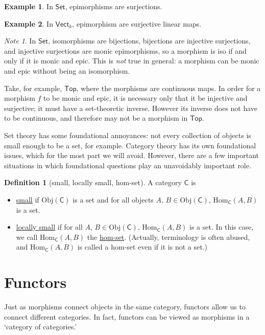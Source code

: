 \documentclass[a4paper]{report}
\newcommand{\defn}[1]{\ul{#1}}
\newcommand{\Obj}{\mathrm{Obj}}
\newcommand{\Hom}{\mathrm{Hom}}
\theoremstyle{definition}
\newtheorem{definition}{Definition}[section]
\newtheorem{example}{Example}[section]
\theoremstyle{plain}
\theoremstyle{remark}
\newtheorem{note}{Note}[section]
\begin{document}
\begin{example}
  \label{eg:epimorphismsinkvect}
  In $\mathsf{Set}$, epimorphisms are surjections.
\end{example}

\begin{example}
  In $\mathsf{Vect}_{k}$, epimorphism are surjective linear maps.
\end{example}

\begin{note}
  In $\mathsf{Set}$, isomorphisms are bijections, bijections are injective surjections, and injective surjections are monic epimorphisms, so a morphism is iso if and only if it is monic and epic. This is \emph{not} true in general: a morphism can be monic and epic without being an isomorphism.

  Take, for example, $\mathsf{Top}$, where the morphisms are continuous maps. In order for a morphism $f$ to be monic and epic, it is necessary only that it be injective and surjective; it must have a set-theoretic inverse. However its inverse does not have to be continuous, and therefore may not be a morphism in $\mathsf{Top}$.
\end{note}

Set theory has some foundational annoyances: not every collection of objects is small enough to be a set, for example. Category theory has its own foundational issues, which for the most part we will avoid. However, there are a few important situations in which foundational questions play an unavoidably important role.
\begin{definition}[small, locally small, hom-set]
  \label{def:smalllocallysmallcategoryhomset}
  A category $\mathsf{C}$ is 
  \begin{itemize}
    \item \defn{small} if $\Obj(\mathsf{C})$ is a set and for all objects $A$, $B \in \Obj(\mathsf{C})$, $\Hom_{\mathsf{C}}(A, B)$ is a set.

    \item \defn{locally small} if for all $A$, $B \in \Obj(\mathsf{C})$, $\Hom_{\mathsf{C}}(A, B)$ is a set. In this case, we call $\Hom_{\mathsf{C}}(A, B)$ the \defn{hom-set}. (Actually, terminology is often abused, and $\Hom_{\mathsf{C}}(A, B)$ is called a hom-set even if it is not a set.)
  \end{itemize}
\end{definition}

\section{Functors} \label{sec:functors}
Just as morphisms connect objects in the same category, functors allow us to connect different categories. In fact, functors can be viewed as morphisms in a `category of categories.'
\end{document}

